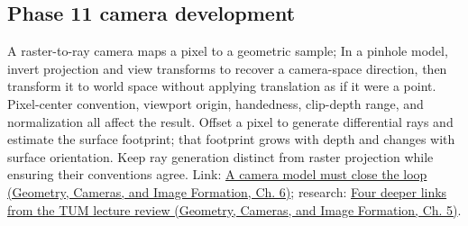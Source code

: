 \subsection{Phase 11 camera development}\label{appendix-1c07d64f5e70-phase-11-camera-development}

\hypertarget{appendix-1c07d64f5e70-phase-11-camera-development}{}

A raster-to-ray camera maps a pixel to a geometric sample; In a pinhole model, invert projection and view transforms to recover a camera-space direction, then transform it to world space without applying translation as if it were a point. Pixel-center convention, viewport origin, handedness, clip-depth range, and normalization all affect the result. Offset a pixel to generate differential rays and estimate the surface footprint; that footprint grows with depth and changes with surface orientation. Keep ray generation distinct from raster projection while ensuring their conventions agree. Link: \href{../03-Geometry-Cameras-and-Image-Formation/main.pdf\#nameddest=02-foundations-ii-ch037-a-camera-model-must-close-the-loop}{A camera model must close the loop (Geometry, Cameras, and Image Formation, Ch. 6)}; research: \href{../03-Geometry-Cameras-and-Image-Formation/main.pdf\#nameddest=02-foundations-ii-ch036-four-deeper-links-from-the-tum-lecture-review}{Four deeper links from the TUM lecture review (Geometry, Cameras, and Image Formation, Ch. 5)}.
